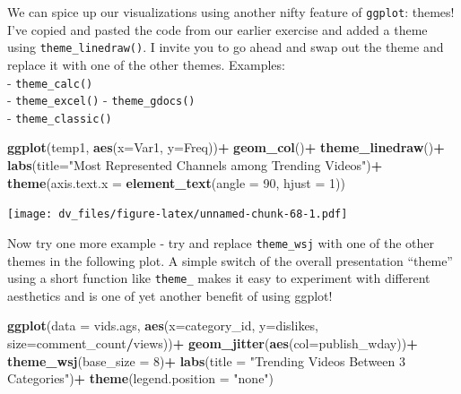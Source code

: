 \documentclass[]{article}
\newenvironment{Shaded}{\begin{snugshade}}{\end{snugshade}}
\newcommand{\DataTypeTok}[1]{\textcolor[rgb]{0.13,0.29,0.53}{#1}}
\newcommand{\DecValTok}[1]{\textcolor[rgb]{0.00,0.00,0.81}{#1}}
\newcommand{\KeywordTok}[1]{\textcolor[rgb]{0.13,0.29,0.53}{\textbf{#1}}}
\newcommand{\NormalTok}[1]{#1}
\newcommand{\OperatorTok}[1]{\textcolor[rgb]{0.81,0.36,0.00}{\textbf{#1}}}
\newcommand{\StringTok}[1]{\textcolor[rgb]{0.31,0.60,0.02}{#1}}
\begin{document}
We can spice up our visualizations using another nifty feature of
\texttt{ggplot}: themes! I've copied and pasted the code from our
earlier exercise and added a theme using \texttt{theme\_linedraw()}. I
invite you to go ahead and swap out the theme and replace it with one of
the other themes. Examples:\\
- \texttt{theme\_calc()}\\
- \texttt{theme\_excel()} - \texttt{theme\_gdocs()}\\
- \texttt{theme\_classic()}

\begin{Shaded}
\begin{Highlighting}[]
\KeywordTok{ggplot}\NormalTok{(temp1, }\KeywordTok{aes}\NormalTok{(}\DataTypeTok{x=}\NormalTok{Var1, }\DataTypeTok{y=}\NormalTok{Freq))}\OperatorTok{+}
\StringTok{  }\KeywordTok{geom_col}\NormalTok{()}\OperatorTok{+}
\StringTok{  }\KeywordTok{theme_linedraw}\NormalTok{()}\OperatorTok{+}
\StringTok{  }\KeywordTok{labs}\NormalTok{(}\DataTypeTok{title=}\StringTok{"Most Represented Channels among Trending Videos"}\NormalTok{)}\OperatorTok{+}
\StringTok{  }\KeywordTok{theme}\NormalTok{(}\DataTypeTok{axis.text.x =} \KeywordTok{element_text}\NormalTok{(}\DataTypeTok{angle =} \DecValTok{90}\NormalTok{, }\DataTypeTok{hjust =} \DecValTok{1}\NormalTok{))}
\end{Highlighting}
\end{Shaded}

\texttt{[image: dv\_files/figure-latex/unnamed-chunk-68-1.pdf]}

Now try one more example - try and replace \texttt{theme\_wsj} with one
of the other themes in the following plot. A simple switch of the
overall presentation ``theme'' using a short function like
\texttt{theme\_} makes it easy to experiment with different aesthetics
and is one of yet another benefit of using ggplot!

\begin{Shaded}
\begin{Highlighting}[]
\KeywordTok{ggplot}\NormalTok{(}\DataTypeTok{data =}\NormalTok{ vids.ags, }\KeywordTok{aes}\NormalTok{(}\DataTypeTok{x=}\NormalTok{category_id, }\DataTypeTok{y=}\NormalTok{dislikes, }\DataTypeTok{size=}\NormalTok{comment_count}\OperatorTok{/}\NormalTok{views))}\OperatorTok{+}
\StringTok{  }\KeywordTok{geom_jitter}\NormalTok{(}\KeywordTok{aes}\NormalTok{(}\DataTypeTok{col=}\NormalTok{publish_wday))}\OperatorTok{+}
\StringTok{  }\KeywordTok{theme_wsj}\NormalTok{(}\DataTypeTok{base_size =} \DecValTok{8}\NormalTok{)}\OperatorTok{+}
\StringTok{  }\KeywordTok{labs}\NormalTok{(}\DataTypeTok{title =} \StringTok{"Trending Videos Between 3 Categories"}\NormalTok{)}\OperatorTok{+}
\StringTok{  }\KeywordTok{theme}\NormalTok{(}\DataTypeTok{legend.position =} \StringTok{"none"}\NormalTok{)}
\end{Highlighting}
\end{Shaded}
\end{document}
